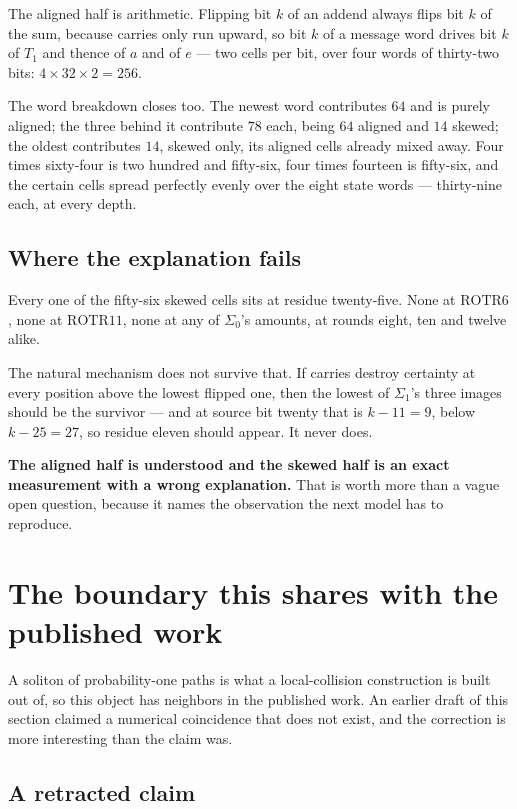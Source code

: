 The aligned half is arithmetic. Flipping bit \(k\) of an addend always flips bit \(k\) of the sum,
because carries only run upward, so bit \(k\) of a message word drives bit \(k\) of \(T_1\) and
thence of \(a\) and of \(e\) --- two cells per bit, over four words of thirty-two bits:
\(4 \times 32 \times 2 = 256\).

The word breakdown closes too. The newest word contributes \(64\) and is purely aligned; the three
behind it contribute \(78\) each, being \(64\) aligned and \(14\) skewed; the oldest contributes
\(14\), skewed only, its aligned cells already mixed away. Four times sixty-four is two hundred and
fifty-six, four times fourteen is fifty-six, and the certain cells spread perfectly evenly over the
eight state words --- thirty-nine each, at every depth.

\subsection{Where the explanation fails}

Every one of the fifty-six skewed cells sits at residue twenty-five. None at \(\mathrm{ROTR}6\),
none at \(\mathrm{ROTR}11\), none at any of \(\Sigma_0\)'s amounts, at rounds eight, ten and twelve
alike.

The natural mechanism does not survive that. If carries destroy certainty at every position above
the lowest flipped one, then the lowest of \(\Sigma_1\)'s three images should be the survivor --- and
at source bit twenty that is \(k - 11 = 9\), below \(k - 25 = 27\), so residue eleven should appear.
It never does.

\textbf{The aligned half is understood and the skewed half is an exact measurement with a wrong
explanation.} That is worth more than a vague open question, because it names the observation the
next model has to reproduce.

\section{The boundary this shares with the published work}

A soliton of probability-one paths is what a local-collision construction is built out of, so this
object has neighbors in the published work. An earlier draft of this section claimed a numerical
coincidence that does not exist, and the correction is more interesting than the claim was.

\subsection{A retracted claim}

